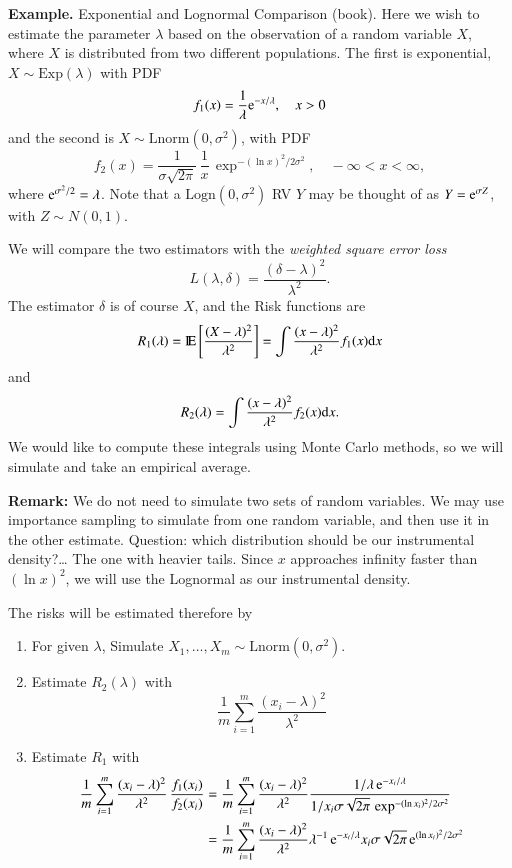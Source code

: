\documentclass[captions=tableheading]{scrbook}
\begin{document}
\textbf{Example.} Exponential and Lognormal Comparison (book). Here we wish to estimate the parameter $\lambda$ based on the observation of a random variable $X$, where $X$ is distributed from two different populations. The first is exponential, $X\sim\mathrm{Exp}(\lambda)$ with PDF 
\[
f_{1}(x)=\frac{1}{\lambda}\mathrm{e}^{-x/\lambda},\quad x>0
\]
 and the second is $X\sim\mathrm{Lnorm}(0,\sigma^{2})$, with PDF
\[
f_{2}(x)=\frac{1}{\sigma\sqrt{2\pi}}\,\frac{1}{x}\,\exp^{-(\ln x)^{2}/2\sigma^{2}},\quad-\infty<x<\infty,
\]
where $\mathrm{e}^{\sigma^{2}/2}=\lambda$. Note that a $\mathrm{Logn}(0,\sigma^{2})$ RV $Y$ may be thought of as $Y=\mathrm{e}^{\sigma Z}$, with $Z \sim N(0,1)$.

We will compare the two estimators with the \emph{weighted square error loss} 
\[
L(\lambda,\delta)=\frac{(\delta-\lambda)^{2}}{\lambda^{2}}.
\]
The estimator $\delta$ is of course $X$, and the Risk functions are 
\[
R_{1}(\lambda)=\mathrm{I\hspace{-1.5pt}E}\left[\frac{(X-\lambda)^{2}}{\lambda^{2}}\right]=\int\frac{(x-\lambda)^{2}}{\lambda^{2}}f_{1}(x)\mathrm{d} x
\]
and 
\[
R_{2}(\lambda)=\int\frac{(x - \lambda)^{2}}{\lambda^{2}}f_{2}(x)\mathrm{d} x.
\]
We would like to compute these integrals using Monte Carlo methods, so we will simulate and take an empirical average.  

\textbf{Remark:}  We do not need to simulate two sets of random variables. We may use importance sampling to simulate from one random variable, and then use it in the other estimate. Question: which distribution should be our instrumental density?\ldots{} The one with heavier tails. Since $x$ approaches infinity faster than $(\ln x)^{2}$, we will use the Lognormal as our instrumental density.

The risks will be estimated therefore by

\begin{enumerate}
\item For given $\lambda$, Simulate $X_{1},\ldots,X_{m} \sim \mathrm{Lnorm}(0,\sigma^{2})$.
\item Estimate $R_{2}(\lambda)$ with 
   \[
   \frac{1}{m}\sum_{i=1}^{m}\frac{(x_{i}-\lambda)^{2}}{\lambda^{2}}
   \]
\item Estimate $R_{1}$ with 
   \begin{align*}
   \frac{1}{m}\sum_{i=1}^{m}\frac{(x_{i}-\lambda)^{2}}{\lambda^{2}}\,\frac{f_{1}(x_{i})}{f_{2}(x_{i})} & =\frac{1}{m}\sum_{i=1}^{m}\frac{(x_{i}-\lambda)^{2}}{\lambda^{2}}\frac{1/\lambda\, \mathrm{e}^{-x_{i}/\lambda}}{1/x_{i}\sigma\sqrt{2\pi}\,\exp^{-(\ln x_{i})^{2}/2\sigma^{2}}}\\
 & =\frac{1}{m}\sum_{i=1}^{m}\frac{(x_{i}-\lambda)^{2}}{\lambda^{2}}\lambda^{-1}\, \mathrm{e}^{-x_{i}/\lambda}x_{i}\sigma\sqrt{2\pi}\, \mathrm{e}^{(\ln x_{i})^{2}/2\sigma^{2}}
   \end{align*}
\end{enumerate}
\end{document}
